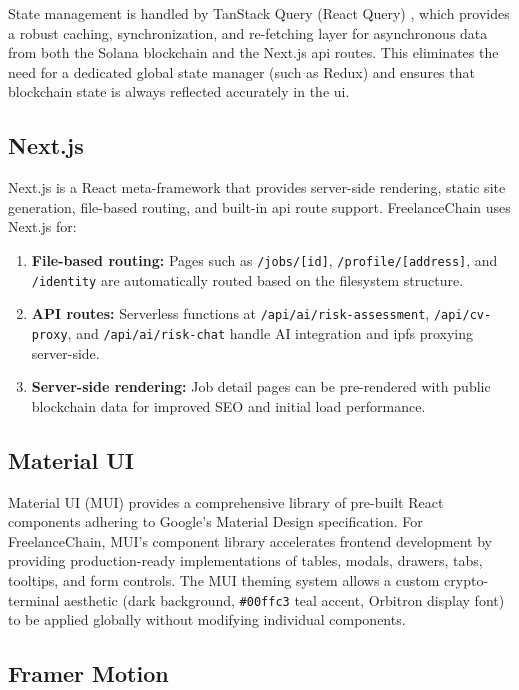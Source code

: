 State management is handled by TanStack Query (React Query) \cite{reactquery2023}, which provides a robust caching, synchronization, and re-fetching layer for asynchronous data from both the Solana blockchain and the Next.js \gls{api} routes. This eliminates the need for a dedicated global state manager (such as Redux) and ensures that blockchain state is always reflected accurately in the \gls{ui}.

\subsection{Next.js}

Next.js \cite{nextjs2023} is a React meta-framework that provides server-side rendering, static site generation, file-based routing, and built-in \gls{api} route support. FreelanceChain uses Next.js for:

\begin{enumerate}
    \item \textbf{File-based routing:} Pages such as \texttt{/jobs/[id]}, \texttt{/profile/[address]}, and \texttt{/identity} are automatically routed based on the filesystem structure.
    \item \textbf{API routes:} Serverless functions at \texttt{/api/ai/risk-assessment}, \texttt{/api/cv-proxy}, and \texttt{/api/ai/risk-chat} handle AI integration and \gls{ipfs} proxying server-side.
    \item \textbf{Server-side rendering:} Job detail pages can be pre-rendered with public blockchain data for improved SEO and initial load performance.
\end{enumerate}

\subsection{Material UI}

Material UI (MUI) \cite{materialui2023} provides a comprehensive library of pre-built React components adhering to Google's Material Design specification. For FreelanceChain, MUI's component library accelerates frontend development by providing production-ready implementations of tables, modals, drawers, tabs, tooltips, and form controls. The MUI theming system allows a custom crypto-terminal aesthetic (dark background, \texttt{\#00ffc3} teal accent, Orbitron display font) to be applied globally without modifying individual components.

\subsection{Framer Motion}

